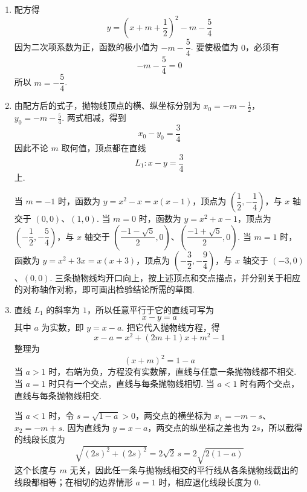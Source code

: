 \documentclass[UTF8,a4paper,oneside,11pt]{ctexbook}
\begin{document}
\begin{solution}
\begin{enumerate}
\item 配方得
\[
y=\left(x+m+\frac{1}{2}\right)^{2}-m-\frac{5}{4}
\]
因为二次项系数为正，函数的极小值为 \(-m-\dfrac{5}{4}\). 要使极值为 \(0\)，必须有
\[
-m-\frac{5}{4}=0
\]
所以 \(m=-\dfrac{5}{4}\).

\item 由配方后的式子，抛物线顶点的横、纵坐标分别为
\(x_{0}=-m-\frac{1}{2}\)，\(y_{0}=-m-\frac{5}{4}\).
两式相减，得到
\[
x_{0}-y_{0}=\frac{3}{4}
\]
因此不论 \(m\) 取何值，顶点都在直线
\[
L_{1}:x-y=\frac{3}{4}
\]
上.

当 \(m=-1\) 时，函数为 \(y=x^{2}-x=x(x-1)\)，顶点为 \(\left(\dfrac{1}{2},-\dfrac{1}{4}\right)\)，与 \(x\) 轴交于 \((0,0)\)、\((1,0)\). 当 \(m=0\) 时，函数为 \(y=x^{2}+x-1\)，顶点为 \(\left(-\dfrac{1}{2},-\dfrac{5}{4}\right)\)，与 \(x\) 轴交于 \(\left(\dfrac{-1-\sqrt{5}}{2},0\right)\)、\(\left(\dfrac{-1+\sqrt{5}}{2},0\right)\). 当 \(m=1\) 时，函数为 \(y=x^{2}+3x=x(x+3)\)，顶点为 \(\left(-\dfrac{3}{2},-\dfrac{9}{4}\right)\)，与 \(x\) 轴交于 \((-3,0)\)、\((0,0)\). 三条抛物线均开口向上，按上述顶点和交点描点，并分别关于相应的对称轴作对称，即可画出检验结论所需的草图.

\item 直线 \(L_{1}\) 的斜率为 \(1\)，所以任意平行于它的直线可写为
\[
x-y=a
\]
其中 \(a\) 为实数，即 \(y=x-a\). 把它代入抛物线方程，得
\[
x-a=x^{2}+(2m+1)x+m^{2}-1
\]
整理为
\[
(x+m)^{2}=1-a
\]
当 \(a>1\) 时，右端为负，方程没有实数解，直线与任意一条抛物线都不相交. 当 \(a=1\) 时只有一个交点，直线与每条抛物线相切. 当 \(a<1\) 时有两个交点，直线与每条抛物线相交.

当 \(a<1\) 时，令 \(s=\sqrt{1-a}>0\)，两交点的横坐标为 \(x_{1}=-m-s\)、\(x_{2}=-m+s\). 因为直线为 \(y=x-a\)，两交点的纵坐标之差也为 \(2s\)，所以截得的线段长度为
\[
\sqrt{(2s)^{2}+(2s)^{2}}=2\sqrt{2}\,s=2\sqrt{2(1-a)}
\]
这个长度与 \(m\) 无关，因此任一条与抛物线相交的平行线从各条抛物线截出的线段都相等；在相切的边界情形 \(a=1\) 时，相应退化线段长度为 \(0\).
\end{enumerate}
\end{solution}

\end{document}
